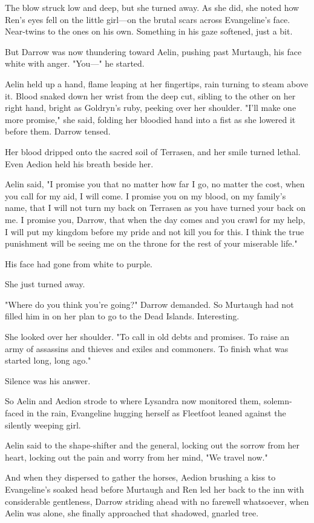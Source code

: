The blow struck low and deep, but she turned away. As she did, she noted how Ren's eyes fell on the little girl---on the brutal scars across Evangeline's face. Near-twins to the ones on his own. Something in his gaze softened, just a bit.

But Darrow was now thundering toward Aelin, pushing past Murtaugh, his face white with anger. "You---" he started.

Aelin held up a hand, flame leaping at her fingertips, rain turning to steam above it. Blood snaked down her wrist from the deep cut, sibling to the other on her right hand, bright as Goldryn's ruby, peeking over her shoulder. "I'll make one more promise," she said, folding her bloodied hand into a fist as she lowered it before them. Darrow tensed.

Her blood dripped onto the sacred soil of Terrasen, and her smile turned lethal. Even Aedion held his breath beside her.

Aelin said, "I promise you that no matter how far I go, no matter the cost, when you call for my aid, I will come. I promise you on my blood, on my family's name, that I will not turn my back on Terrasen as you have turned your back on me. I promise you, Darrow, that when the day comes and you crawl for my help, I will put my kingdom before my pride and not kill you for this. I think the true punishment will be seeing me on the throne for the rest of your miserable life."

His face had gone from white to purple.

She just turned away.

"Where do you think you're going?" Darrow demanded. So Murtaugh had not filled him in on her plan to go to the Dead Islands. Interesting.

She looked over her shoulder. "To call in old debts and promises. To raise an army of assassins and thieves and exiles and commoners. To finish what was started long, long ago."

Silence was his answer.

So Aelin and Aedion strode to where Lysandra now monitored them, solemn-faced in the rain, Evangeline hugging herself as Fleetfoot leaned against the silently weeping girl.

Aelin said to the shape-shifter and the general, locking out the sorrow from her heart, locking out the pain and worry from her mind, "We travel now."

And when they dispersed to gather the horses, Aedion brushing a kiss to Evangeline's soaked head before Murtaugh and Ren led her back to the inn with considerable gentleness, Darrow striding ahead with no farewell whatsoever, when Aelin was alone, she finally approached that shadowed, gnarled tree.

